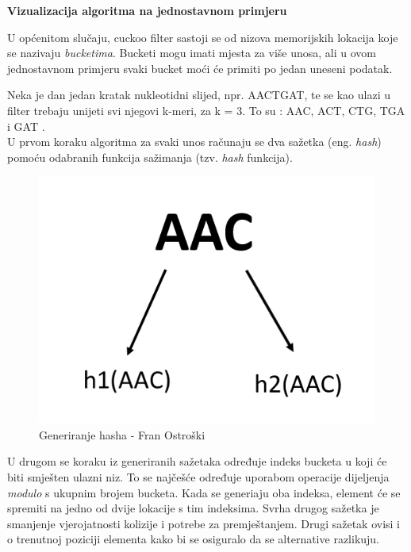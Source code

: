 \documentclass[times, utf8, seminar, numeric]{fer}
\begin{document}
\begin{flushleft}
\textbf{Vizualizacija algoritma na jednostavnom primjeru}
\end{flushleft}


U općenitom slučaju, cuckoo filter sastoji se od nizova memorijskih lokacija koje se nazivaju \textit{bucketima}. Bucketi mogu imati mjesta za više unosa, ali u ovom jednostavnom primjeru svaki bucket moći će primiti  po jedan uneseni podatak.

Neka je dan jedan kratak nukleotidni slijed, npr. AACTGAT, te se kao ulazi u filter trebaju unijeti svi njegovi k-meri, za k = 3. To su : AAC, ACT, CTG, TGA i GAT . \\
U prvom koraku algoritma za svaki unos računaju se dva sažetka (eng. \textit{hash}) pomoću odabranih funkcija sažimanja (tzv. \textit{hash} funkcija).

\begin{figure}[H]
  \centering
  \setlength{\intextsep}{5pt}
  \includegraphics[scale = 0.75]{images/hashing.png}
  \caption{Generiranje hasha - Fran Ostroški}
  \label{fig_hash}
\end{figure}

U drugom se koraku iz generiranih sažetaka određuje indeks bucketa u koji će biti smješten ulazni niz. To se najčešće određuje uporabom operacije dijeljenja \textit{modulo} s ukupnim brojem bucketa. Kada se generiaju oba indeksa, element će se spremiti na jedno od dvije lokacije s tim indeksima. Svrha drugog sažetka je smanjenje vjerojatnosti kolizije i potrebe za premještanjem. Drugi sažetak ovisi i o trenutnoj poziciji elementa kako bi se osiguralo da se alternative razlikuju. 
\end{document}
